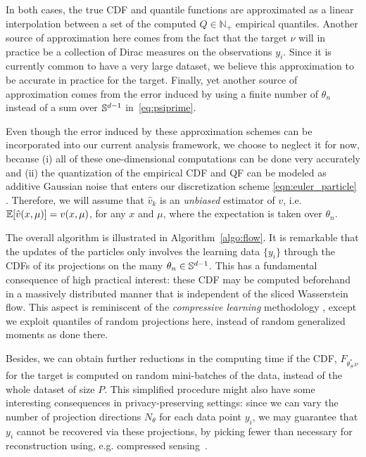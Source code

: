 In both cases, the true CDF and quantile functions are approximated as a linear interpolation between a set of the computed $Q\in\mathbb{N}_+$ empirical quantiles.
Another source of approximation here comes from the fact that the target $\nu$ will in practice be a collection of Dirac measures on the observations $y_i$. Since it is currently common to have a very large dataset, we believe this approximation to be accurate in practice for the target.
Finally, yet another source of approximation comes from the error induced by using a finite number of $\theta_n$ instead of a sum over $\mathbb{S}^{d-1}$ in~\eqref{eq:psiprime}.

Even though the error induced by these approximation schemes can be incorporated into our current analysis framework, we choose to neglect it for now, because (i) all of these one-dimensional computations can be done very accurately and (ii) the quantization of the empirical CDF and QF can be modeled as additive Gaussian noise that enters our discretization scheme \eqref{eqn:euler_particle} \cite{van1998asymptotic}.
Therefore, we will assume that $\hat{v}_k$ is an \emph{unbiased} estimator of $v$, i.e.\ $\mathbb{E}[\hat{v}(x,\mu)] = v(x,\mu)$, for any $x$ and $\mu$, where the expectation is taken over $\theta_{n}$.



The overall algorithm is illustrated in Algorithm~\ref{algo:flow}. It is remarkable that the updates of the particles only involves the learning data $\{y_i\}$ through the CDFs of its projections on the many $\theta_{n}\in\mathbb{S}^{d-1}$. This has a fundamental consequence of high practical interest: these CDF may be computed beforehand in a massively distributed manner that is independent of the sliced Wasserstein flow. This aspect is reminiscent of the \textit{compressive learning} methodology \cite{gribonval2017compressive}, except we exploit quantiles of random projections here, instead of random generalized moments as done there.

Besides, we can obtain further reductions in the computing time if the CDF, $F_{\theta^*_\#\nu}$ for the target is computed on random mini-batches of the data, instead of the whole dataset of size $P$. This simplified procedure might also have some interesting consequences in privacy-preserving settings: since we can vary the number of projection directions $N_\theta$ for each data point $y_i$, we may guarantee that $y_i$ cannot be recovered via these projections, by picking fewer than necessary for reconstruction using, e.g. compressed sensing~\cite{donoho2009observed}.




